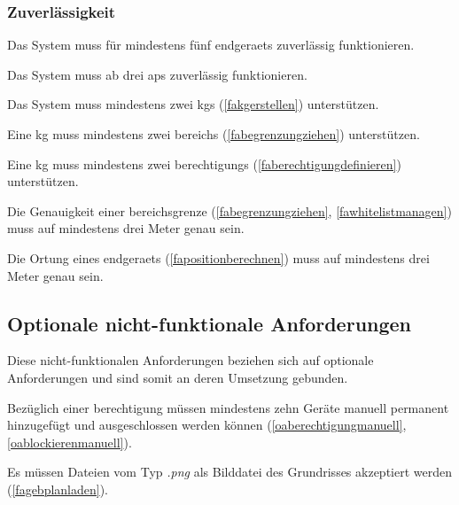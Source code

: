 \subsubsection{Zuverlässigkeit}
\begin{nfalist}[resume]
	\item Das System muss für mindestens fünf \glspl{endgeraet} zuverlässig funktionieren.
	\item Das System muss ab drei \glspl{ap} zuverlässig funktionieren. 
	\item Das System muss mindestens zwei \glspl{kg} (\ref{fakgerstellen}) unterstützen.
	\item Eine \gls{kg} muss mindestens zwei \glspl{bereich} (\ref{fabegrenzungziehen}) unterstützen.
	\item Eine \gls{kg} muss mindestens zwei \glspl{berechtigung} (\ref{faberechtigungdefinieren}) unterstützen.
	\item Die Genauigkeit einer \gls{bereich}sgrenze (\ref{fabegrenzungziehen}, \ref{fawhitelistmanagen}) muss auf mindestens drei Meter genau sein.
	\item Die Ortung eines \gls{endgeraet}s (\ref{fapositionberechnen}) muss auf mindestens drei Meter genau sein. 
\end{nfalist}







\subsection{Optionale nicht-funktionale Anforderungen}

Diese nicht-funktionalen Anforderungen beziehen sich auf optionale Anforderungen und sind somit an deren Umsetzung gebunden.

\begin{nfalist}[resume]	
	\item Bezüglich einer \gls{berechtigung} müssen mindestens zehn Geräte manuell permanent hinzugefügt und ausgeschlossen werden können (\ref{oaberechtigungmanuell}, \ref{oablockierenmanuell}).
	\item Es müssen Dateien vom Typ \emph{.png} als Bilddatei des Grundrisses akzeptiert werden (\ref{fagebplanladen}).
\end{nfalist}